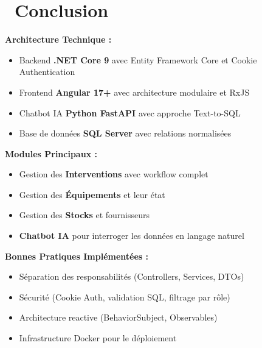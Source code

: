 \documentclass[12pt,a4paper]{article}
\begin{document}
\newpage

\section{\faFlagCheckered\ Conclusion}

\begin{tcolorbox}[
    enhanced,
    colback=primaryblue!10,
    colframe=primaryblue,
    title={\faStar\ Résumé de l'Application GMAO},
    fonttitle=\bfseries
]

\textbf{Architecture Technique :}
\begin{itemize}
    \item Backend \textbf{.NET Core 9} avec Entity Framework Core et Cookie Authentication
    \item Frontend \textbf{Angular 17+} avec architecture modulaire et RxJS
    \item Chatbot IA \textbf{Python FastAPI} avec approche Text-to-SQL
    \item Base de données \textbf{SQL Server} avec relations normalisées
\end{itemize}

\vspace{0.3cm}

\textbf{Modules Principaux :}
\begin{itemize}
    \item Gestion des \textbf{Interventions} avec workflow complet
    \item Gestion des \textbf{Équipements} et leur état
    \item Gestion des \textbf{Stocks} et fournisseurs
    \item \textbf{Chatbot IA} pour interroger les données en langage naturel
\end{itemize}

\vspace{0.3cm}

\textbf{Bonnes Pratiques Implémentées :}
\begin{itemize}
    \item Séparation des responsabilités (Controllers, Services, DTOs)
    \item Sécurité (Cookie Auth, validation SQL, filtrage par rôle)
    \item Architecture reactive (BehaviorSubject, Observables)
    \item Infrastructure Docker pour le déploiement
\end{itemize}

\end{tcolorbox}
\end{document}
